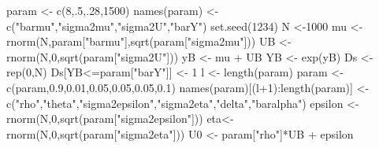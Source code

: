 \documentclass[
]{book}
\newenvironment{Shaded}{\begin{snugshade}}{\end{snugshade}}
\newcommand{\DecValTok}[1]{\textcolor[rgb]{0.00,0.00,0.81}{#1}}
\newcommand{\FloatTok}[1]{\textcolor[rgb]{0.00,0.00,0.81}{#1}}
\newcommand{\FunctionTok}[1]{\textcolor[rgb]{0.00,0.00,0.00}{#1}}
\newcommand{\NormalTok}[1]{#1}
\newcommand{\OtherTok}[1]{\textcolor[rgb]{0.56,0.35,0.01}{#1}}
\newcommand{\SpecialCharTok}[1]{\textcolor[rgb]{0.00,0.00,0.00}{#1}}
\newcommand{\StringTok}[1]{\textcolor[rgb]{0.31,0.60,0.02}{#1}}
\theoremstyle{definition}
\theoremstyle{definition}
\theoremstyle{definition}
\theoremstyle{definition}
\theoremstyle{remark}
\begin{document}
\begin{Shaded}
\begin{Highlighting}[]
\NormalTok{param }\OtherTok{\textless{}{-}} \FunctionTok{c}\NormalTok{(}\DecValTok{8}\NormalTok{,.}\DecValTok{5}\NormalTok{,.}\DecValTok{28}\NormalTok{,}\DecValTok{1500}\NormalTok{)}
\FunctionTok{names}\NormalTok{(param) }\OtherTok{\textless{}{-}} \FunctionTok{c}\NormalTok{(}\StringTok{"barmu"}\NormalTok{,}\StringTok{"sigma2mu"}\NormalTok{,}\StringTok{"sigma2U"}\NormalTok{,}\StringTok{"barY"}\NormalTok{)}
\FunctionTok{set.seed}\NormalTok{(}\DecValTok{1234}\NormalTok{)}
\NormalTok{N }\OtherTok{\textless{}{-}}\DecValTok{1000}
\NormalTok{mu }\OtherTok{\textless{}{-}} \FunctionTok{rnorm}\NormalTok{(N,param[}\StringTok{"barmu"}\NormalTok{],}\FunctionTok{sqrt}\NormalTok{(param[}\StringTok{"sigma2mu"}\NormalTok{]))}
\NormalTok{UB }\OtherTok{\textless{}{-}} \FunctionTok{rnorm}\NormalTok{(N,}\DecValTok{0}\NormalTok{,}\FunctionTok{sqrt}\NormalTok{(param[}\StringTok{"sigma2U"}\NormalTok{]))}
\NormalTok{yB }\OtherTok{\textless{}{-}}\NormalTok{ mu }\SpecialCharTok{+}\NormalTok{ UB }
\NormalTok{YB }\OtherTok{\textless{}{-}} \FunctionTok{exp}\NormalTok{(yB)}
\NormalTok{Ds }\OtherTok{\textless{}{-}} \FunctionTok{rep}\NormalTok{(}\DecValTok{0}\NormalTok{,N)}
\NormalTok{Ds[YB}\SpecialCharTok{\textless{}=}\NormalTok{param[}\StringTok{"barY"}\NormalTok{]] }\OtherTok{\textless{}{-}} \DecValTok{1} 
\NormalTok{l }\OtherTok{\textless{}{-}} \FunctionTok{length}\NormalTok{(param)}
\NormalTok{param }\OtherTok{\textless{}{-}} \FunctionTok{c}\NormalTok{(param,}\FloatTok{0.9}\NormalTok{,}\FloatTok{0.01}\NormalTok{,}\FloatTok{0.05}\NormalTok{,}\FloatTok{0.05}\NormalTok{,}\FloatTok{0.05}\NormalTok{,}\FloatTok{0.1}\NormalTok{)}
\FunctionTok{names}\NormalTok{(param)[(l}\SpecialCharTok{+}\DecValTok{1}\NormalTok{)}\SpecialCharTok{:}\FunctionTok{length}\NormalTok{(param)] }\OtherTok{\textless{}{-}} \FunctionTok{c}\NormalTok{(}\StringTok{"rho"}\NormalTok{,}\StringTok{"theta"}\NormalTok{,}\StringTok{"sigma2epsilon"}\NormalTok{,}\StringTok{"sigma2eta"}\NormalTok{,}\StringTok{"delta"}\NormalTok{,}\StringTok{"baralpha"}\NormalTok{)}
\NormalTok{epsilon }\OtherTok{\textless{}{-}} \FunctionTok{rnorm}\NormalTok{(N,}\DecValTok{0}\NormalTok{,}\FunctionTok{sqrt}\NormalTok{(param[}\StringTok{"sigma2epsilon"}\NormalTok{]))}
\NormalTok{eta}\OtherTok{\textless{}{-}} \FunctionTok{rnorm}\NormalTok{(N,}\DecValTok{0}\NormalTok{,}\FunctionTok{sqrt}\NormalTok{(param[}\StringTok{"sigma2eta"}\NormalTok{]))}
\NormalTok{U0 }\OtherTok{\textless{}{-}}\NormalTok{ param[}\StringTok{"rho"}\NormalTok{]}\SpecialCharTok{*}\NormalTok{UB }\SpecialCharTok{+}\NormalTok{ epsilon}

\end{Highlighting}
\end{Shaded}
\end{document}
